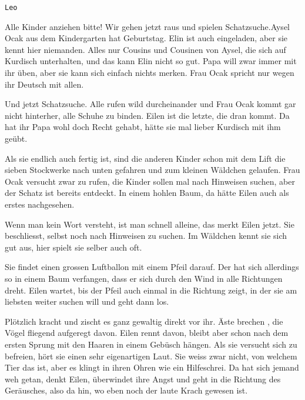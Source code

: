 \thispagestyle{empty}
\begin{center}
\end{center}
\vskip 2cm
{\Huge\color{farbe}\hfill{\tt{Leo}}}
\newpage
\lettrine[lines=2, lhang=.2, loversize=.25, lraise=0.05, findent=0.1em,
nindent=0em]{{\textooquote}A}{}lle Kinder anziehen bitte! Wir gehen jetzt raus und spielen Schatzsuche.\textcoquote Aysel Ocak aus dem Kindergarten hat Geburtstag. Elin ist auch eingeladen, aber sie kennt hier niemanden. Alles nur Cousins und Cousinen von Aysel, die sich auf Kurdisch unterhalten, und das kann Elin nicht so gut. Papa will zwar immer mit ihr üben, aber sie kann sich einfach nichts merken. Frau Ocak spricht nur wegen ihr Deutsch mit allen.

Und jetzt Schatzsuche. Alle rufen wild durcheinander und Frau Ocak kommt gar nicht hinterher, alle Schuhe zu binden. Eilen ist die letzte, die dran kommt. Da hat ihr Papa wohl doch Recht gehabt, hätte sie mal lieber Kurdisch mit ihm geübt.

Als sie endlich auch fertig ist, sind die anderen Kinder schon mit dem Lift die sieben Stockwerke nach unten gefahren und zum kleinen Wäldchen gelaufen. Frau Ocak versucht zwar zu rufen, die Kinder sollen mal nach Hinweisen suchen, aber der Schatz ist bereits entdeckt. In einem hohlen Baum, da hätte Eilen auch als erstes nachgesehen. 

Wenn man kein Wort versteht, ist man schnell alleine, das merkt Eilen jetzt. Sie beschliesst, selbst noch nach Hinweisen zu suchen. Im Wäldchen kennt sie sich gut aus, hier spielt sie selber auch oft. 

Sie findet einen grossen Luftballon mit einem Pfeil darauf. Der hat sich allerdings so in einem Baum verfangen, dass er sich durch den Wind in alle Richtungen dreht. Eilen wartet, bis der Pfeil auch einmal in die Richtung zeigt, in der sie am liebsten weiter suchen will und geht dann los.

Plötzlich kracht und zischt es ganz gewaltig direkt vor ihr. Äste brechen , die Vögel fliegend aufgeregt davon. Eilen rennt davon, bleibt aber schon nach dem ersten Sprung mit den Haaren in einem Gebüsch hängen. Als sie versucht sich zu befreien, hört sie einen sehr eigenartigen Laut. Sie weiss zwar nicht, von welchem Tier das ist, aber es klingt in ihren Ohren wie ein Hilfeschrei. Da hat sich jemand weh getan, denkt Eilen, überwindet ihre Angst und geht in die Richtung des Geräusches, also da hin, wo eben noch der laute Krach gewesen ist.

